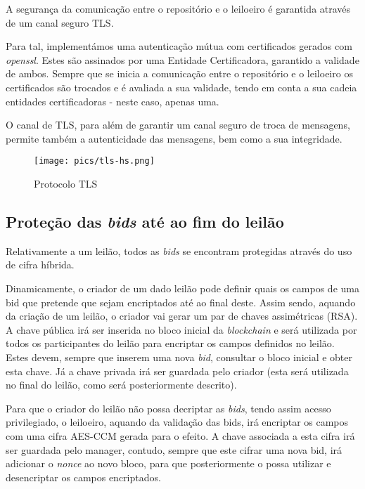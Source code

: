 \documentclass[12pt]{article}
\begin{document}
\par A segurança da comunicação entre o repositório e o leiloeiro é garantida através de um canal seguro TLS.
\par Para tal, implementámos uma autenticação mútua com certificados gerados com \textit{openssl}. Estes são assinados por uma Entidade Certificadora, garantido a validade de ambos. Sempre que se inicia a comunicação entre o repositório e o leiloeiro os certificados são trocados e é avaliada a sua validade, tendo em conta a sua cadeia entidades certificadoras - neste caso, apenas uma.
\par O canal de TLS, para além de garantir um canal seguro de troca de mensagens, permite também a autenticidade das mensagens, bem como a sua integridade.

\begin{figure}[h!]
    \centering
    \texttt{[image: pics/tls-hs.png]}
    \caption{Protocolo TLS}
\end{figure}





\subsection{Proteção das \textit{bids} até ao fim do leilão}

\par Relativamente a um leilão, todos as \textit{bids} se encontram protegidas através do uso de cifra híbrida. 
\par Dinamicamente, o criador de um dado leilão pode definir quais os campos de uma bid que pretende que sejam encriptados até ao final deste. Assim sendo, aquando da criação de um leilão, o criador vai gerar um par de chaves assimétricas (RSA). A chave pública irá ser inserida no bloco inicial da \textit{blockchain} e será utilizada por todos os participantes do leilão para encriptar os campos definidos no leilão. Estes devem, sempre que inserem uma nova \textit{bid}, consultar o bloco inicial e obter esta chave. Já a chave privada irá ser guardada pelo criador (esta será utilizada no final do leilão, como será posteriormente descrito). 
\par Para que o criador do leilão não possa decriptar as \textit{bids}, tendo assim acesso privilegiado, o leiloeiro, aquando da validação das bids, irá encriptar os campos com uma cifra AES-CCM gerada para o efeito. A chave associada a esta cifra irá ser guardada pelo manager, contudo, sempre que este cifrar uma nova bid, irá adicionar o \textit{nonce} ao novo bloco, para que posteriormente o possa utilizar e desencriptar os campos encriptados.
\end{document}
